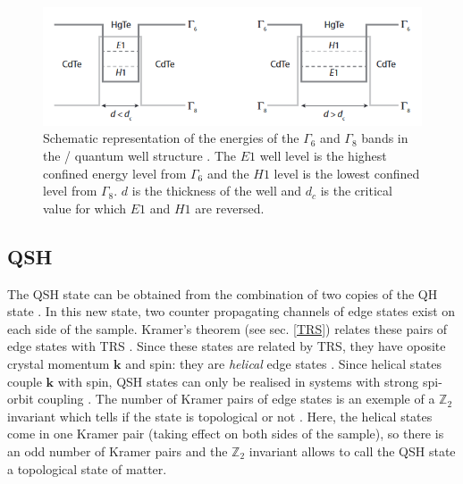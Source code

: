 

\begin{figure}[t]
    \includegraphics[width=\textwidth]{sections/visuel/Hg}
    \centering
    \caption{Schematic representation of the energies of the $\Gamma_6$ and $\Gamma_8$ bands in the / quantum well structure \cite{bernevig_topological_2013}. The  $E1$ well level is the highest confined energy level from $\Gamma_6$ and the $H1$ level is the lowest confined level from $\Gamma_8$. $d$ is the thickness of the well and $d_c$ is the critical value for which $E1$ and $H1$ are reversed.}
    \label{hg}
\end{figure}

\subsection{QSH}

The QSH state can be obtained from the combination of two copies of the QH state \cite{buhmann_quantum_2011}. In this new state, two counter propagating channels of edge states exist on each side of the sample. Kramer's theorem (see sec. \ref{TRS}) relates these pairs of edge states with TRS \cite{buhmann_quantum_2011}. Since these states are related by TRS, they have oposite crystal momentum $\mathbf{k}$ and spin: they are \textit{helical} edge states \cite{bernevig_topological_2013}. Since helical states couple $\mathbf{k}$ with spin, QSH states can only be realised in systems with strong spi-orbit coupling \cite{qi_quantum_2010}. The number of Kramer pairs of edge states is an exemple of a $\mathbb{Z}_2$ invariant which tells if the state is topological or not \cite{koenig_quantum_2008}. Here, the helical states come in one Kramer pair (taking effect on both sides of the sample), so there is an odd number of Kramer pairs and the $\mathbb{Z}_2$ invariant allows to call the QSH state a topological state of matter.\\

